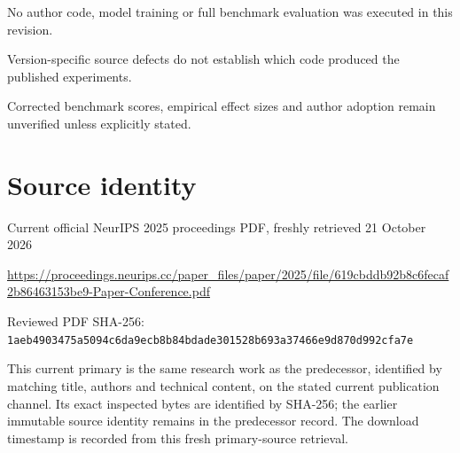 \documentclass[11pt]{article}
\begin{document}
No author code, model training or full benchmark evaluation was executed in this revision.\par

Version-specific source defects do not establish which code produced the published experiments.\par

Corrected benchmark scores, empirical effect sizes and author adoption remain unverified unless explicitly stated.\par

\section*{Source identity}

Current official NeurIPS 2025 proceedings PDF, freshly retrieved 21 October 2026

\url{https://proceedings.neurips.cc/paper_files/paper/2025/file/619cbddb92b8c6fecaf2b86463153be9-Paper-Conference.pdf}

Reviewed PDF SHA-256: \nolinkurl{1aeb4903475a5094c6da9ecb8b84bdade301528b693a37466e9d870d992cfa7e}

This current primary is the same research work as the predecessor, identified by matching title, authors and technical content, on the stated current publication channel. Its exact inspected bytes are identified by SHA-256; the earlier immutable source identity remains in the predecessor record. The download timestamp is recorded from this fresh primary-source retrieval.
\end{document}
